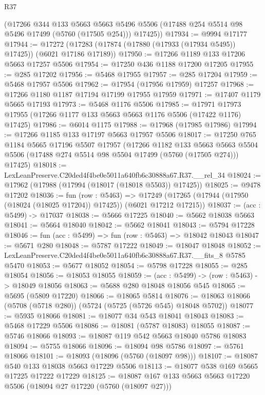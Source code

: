 \begin{lexlean}{R37}
\begin{coremodule}
      (@17266
        @344
        @133
        @5663
        @5663
        @5496
        @5506
        (@17488 @254 @5514 @98 @5496 @17499 (@5760 (@17505 @254)))
        @17425))
@17934 := @9994 @17177
@17944 := @17272 (@17283 (@17874 (@17880 (@17933 (@17934 @5495)) @17425)) (@6021 @17186 @17189))
@17950 := @17266 @1189 @133 @17206 @5663 @17257 @5506
@17954 := @17250 @436 @1188 @17200 @17205
@17955 := @285 @17202
@17956 := @5468 @17955
@17957 := @285 @17204
@17959 := @5468 @17957 @5506
@17962 := @17954 (@17956 @17959) @17257
@17968 := @17266 @1180 @1187 @17194 @17199 @17955 @17959
@17971 := @17407 @1179 @5665 @17193
@17973 := @5468 @1176 @5506
@17985 := @17971 @17973 @17955 (@17266 @1177 @133 @5663 @5663 @1176 @5506 (@17422 @1176) @17425)
@17986 := @6014 @1175
@17988 := @17968 (@17985 @17986)
@17994 := @17266 @1185 @133 @17197 @5663 @17957 @5506
@18017 := @17250
    @765
    @1184
    @5665
    @17196
    @5507
    @17957
    (@17266
      @1182
      @133
      @5663
      @5663
      @5504
      @5506
      (@17488 @274 @5514 @98 @5504 @17499 (@5760 (@17505 @274)))
      @17425)
@18018 := LexLeanPreserve.C20ded4f4be0e5011a640fb6c30888a67.R37.__rel_34
@18024 := @17962 (@17988 (@17994 (@18017 (@18018 @5503)) @17425))
@18025 := @9478 @17202
@18036 := fun (row : @5463) =>
  @17249 (@17265 (@17944 (@17950 (@18024 (@18025 @17204)) @17425)) (@6021 @17212 @17215))
@18037 := (acc : @5499) -> @17037
@18038 := @5666 @17225
@18040 := @5662 @18038 @5663
@18041 := @5664 @18040
@18042 := @5662 @18041
@18043 := @5794 @17228
@18046 := fun (acc : @5499) => fun (row : @5463) => @18042 @18043
@18047 := @5671 @280
@18048 := @5787 @17222
@18049 := @18047 @18048
@18052 := LexLeanPreserve.C20ded4f4be0e5011a640fb6c30888a67.R37.__fits_8 @5785 @5470
@18053 := @5677 @18052
@18054 := @5798 @17228
@18055 := @285 @18054
@18056 := @18053 @18055
@18059 := (acc : @5499) -> (row : @5463) -> @18049 @18056
@18063 := @5688 @280 @18048 @18056 @545
@18065 := @5695 (@5809 @17220)
@18066 := @18065 @5814
@18076 := @18063 @18066 (@5708 (@5718 @280)) (@5724 (@5725 (@5726 @545) @18048 @5702))
@18077 := @5935 @18066
@18081 := @18077 @34 @543 @18041 @18043
@18083 := @5468 @17229 @5506
@18086 := @18081 (@5787 @18083) @18055
@18087 := @5746 @18066
@18093 := @18087 @119 @542 @5663 @18040 @5786 @18083
@18094 := @5755 @18066
@18096 := @18094 @98 @5786
@18097 := @5761 @18066
@18101 := @18093 (@18096 (@5760 (@18097 @98)))
@18107 := @18087 @540 @133 @18038 @5663 @17229 @5506
@18113 := @18077 @538 @169 @5665 @17225 @17222 @17229
@18125 := @18087 @167 @133 @5663 @5663 @17220 @5506 (@18094 @27 @17220 (@5760 (@18097 @27)))

\end{coremodule}
\end{lexlean}
